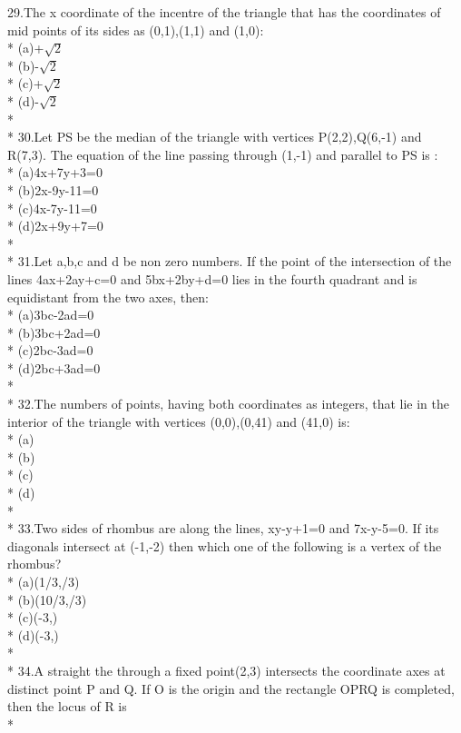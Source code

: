 \documentclass{article}
\begin{document}
{29.\enspace The x coordinate of the incentre of the triangle that has the coordinates of mid points of its sides as (0,1),(1,1) and (1,0):\\*
(a)+$\sqrt2$\\*
(b)-$\sqrt2$\\*
(c)+$\sqrt2$\\*
(d)-$\sqrt2$\\*\\*
30.\enspace Let PS be the median of the triangle with vertices P(2,2),Q(6,-1) and R(7,3). The equation of the line passing through (1,-1) and parallel to PS is :\\*
(a)\enspace 4x+7y+3=0\\*
(b)\enspace 2x-9y-11=0\\*
(c)\enspace 4x-7y-11=0\\*
(d)\enspace 2x+9y+7=0\\*\\*
31.\enspace Let a,b,c and d be non zero numbers. If the point of the intersection of the lines 4ax+2ay+c=0 and 5bx+2by+d=0 lies in the fourth quadrant and is equidistant from the two axes, then:\\*
(a)\enspace 3bc-2ad=0\\*
(b)\enspace 3bc+2ad=0\\*
(c)\enspace 2bc-3ad=0\\*
(d)\enspace 2bc+3ad=0\\*\\*
32.\enspace The numbers of points, having both coordinates as integers, that lie in the interior of the triangle with vertices (0,0),(0,41) and (41,0) is:\\*
(a) \\*
(b)\\*
(c)\\*
(d)\\*\\*
33.\enspace Two sides of rhombus are along the lines, xy-y+1=0 and 7x-y-5=0. If its diagonals intersect at (-1,-2) then which one of the following is a vertex of the rhombus?\\*
(a)\enspace (1/3,/3)\\*
(b)\enspace (10/3,/3)\\*
(c)\enspace (-3,)\\*
(d)\enspace (-3,)\\*\\*
34.\enspace A straight the through a fixed point(2,3) intersects the coordinate axes at distinct point P and Q. If O is the origin and the rectangle OPRQ is completed, then the locus of R is\\*
}
\end{document}
